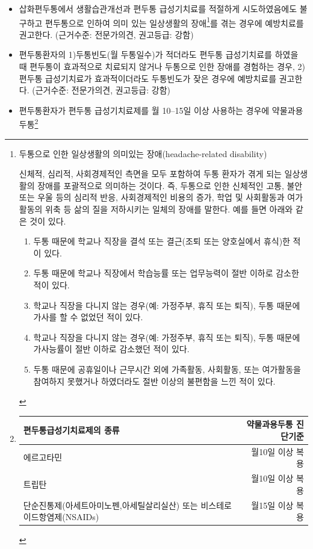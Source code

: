 \documentclass[]{book}
\providecommand{\tightlist}{%
  \setlength{\itemsep}{0pt}\setlength{\parskip}{0pt}}
\let\rmarkdownfootnote\footnote%
\def\footnote{\protect\rmarkdownfootnote}
\begin{document}
\begin{itemize}
\item
  삽화편두통에서 생활습관개선과 편두통 급성기치료를 적절하게 시도하였음에도 불구하고 편두통으로 인하여 의미 있는 일상생활의 장애\footnote{두통으로 인한 일상생활의 의미있는 장애(headache-related disability)

    신체적, 심리적, 사회경제적인 측면을 모두 포함하여 두통 환자가 겪게 되는 일상생활의 장애를 포괄적으로 의미하는 것이다. 즉, 두통으로 인한 신체적인 고통, 불안 또는 우울 등의 심리적 반응, 사회경제적인 비용의 증가, 학업 및 사회활동과 여가활동의 위축 등 삶의 질을 저하시키는 일체의 장애를 말한다. 예를 들면 아래와 같은 것이 있다.

    \begin{enumerate}
    \def\labelenumi{\arabic{enumi}.}
    \tightlist
    \item
      두통 때문에 학교나 직장을 결석 또는 결근(조퇴 또는 양호실에서 휴식)한 적이 있다.
    \item
      두통 때문에 학교나 직장에서 학습능률 또는 업무능력이 절반 이하로 감소한 적이 있다.
    \item
      학교나 직장을 다니지 않는 경우(예: 가정주부, 휴직 또는 퇴직), 두통 때문에 가사를 할 수 없었던 적이 있다.
    \item
      학교나 직장을 다니지 않는 경우(예: 가정주부, 휴직 또는 퇴직), 두통 때문에 가사능률이 절반 이하로 감소했던 적이 있다.
    \item
      두통 때문에 공휴일이나 근무시간 외에 가족활동, 사회활동, 또는 여가활동을 참여하지 못했거나 하였더라도 절반 이상의 불편함을 느낀 적이 있다.
    \end{enumerate}}를 겪는 경우에 예방치료를 권고한다. (근거수준: 전문가의견, 권고등급: 강함)
\item
  편두통환자의 1)두통빈도(월 두통일수)가 적더라도 편두통 급성기치료를 하였을 때 편두통이 효과적으로 치료되지 않거나 두통으로 인한 장애를 경험하는 경우, 2)편두통 급성기치료가 효과적이더라도 두통빈도가 잦은 경우에 예방치료를 권고한다. (근거수준: 전문가의견, 권고등급: 강함)
\item
  편두통환자가 편두통 급성기치료제를 월 10--15일 이상 사용하는 경우에 약물과용두통\footnote{\begin{longtable}[]{@{}lr@{}}
    \toprule
    편두통급성기치료제의 종류 & 약물과용두통 진단기준\tabularnewline
    \midrule
    \endhead
    에르고타민 & 월10일 이상 복용\tabularnewline
    트립탄 & 월10일 이상 복용\tabularnewline
    단순진통제(아세트아미노펜,아세틸살리실산) 또는 비스테로이드항염제(NSAIDs) & 월15일 이상 복용\tabularnewline

\end{longtable}}
\end{itemize}
\end{document}
